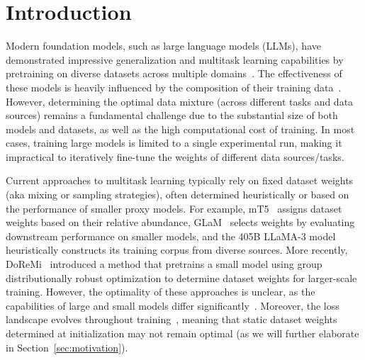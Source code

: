\section{Introduction}

Modern foundation models, such as large language models (LLMs), have demonstrated impressive generalization and multitask learning capabilities by pretraining on diverse datasets across multiple domains~\citep{liu2024deepseek, team2024gemini, chowdhery2022palm, radford2019language}. The effectiveness of these models is heavily influenced by the composition of their training data~\citep{du2022glam, hoffmann2022empirical}. However, determining the optimal data mixture (across different tasks and data sources) remains a fundamental challenge due to the substantial size of both models and datasets, as well as the high computational cost of training. In most cases, training large models is limited to a single experimental run, making it impractical to iteratively fine-tune the weights of different data sources/tasks. 
%



%


Current approaches to multitask learning typically rely on fixed dataset weights (aka mixing or sampling strategies), often determined heuristically or based on the performance of smaller proxy models. For example, mT5~\citep{xue2020mt5} assigns dataset weights based on their relative abundance, GLaM~\citep{du2022glam} selects weights by evaluating downstream performance on smaller models, and the 405B LLaMA-3 model~\citep{dubey2024llama} heuristically constructs its training corpus from diverse sources. More recently, DoReMi~\citep{xie2024doremi} introduced a method that pretrains a small model using group distributionally robust optimization to determine dataset weights for larger-scale training. However, the optimality of these approaches is unclear, as the capabilities of large and small models differ significantly~\citep{team2024gemma, wortsman2023small}. Moreover, the loss landscape evolves throughout training~\citep{zhang2024transformers, li2018measuring}, meaning that static dataset weights determined at initialization may not remain optimal (as we will further elaborate in Section~\ref{sec:motivation}).




%


